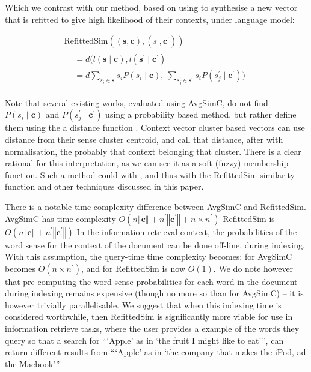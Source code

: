 \documentclass{sig-alternate}
\renewcommand{\c}{\mathbf{c}}
\newcommand{\s}{\mathbf{s}}
\begin{document}
Which we contrast with our method, based on using  to synthesise a new vector that is refitted to give high likelihood of their contexts, under language model:

\begin{multline}
	\mathrm{RefittedSim}((\s,\c),(s^{\prime},\c^{\prime}))\\
	\begin{aligned}
	&= d(l(\s \mid \c), l(\s^\prime \mid \c^\prime)\\
	&= d
	\sum_{s_{i}\in\s}s_{i}P(s_{i}\mid\c),\:
	\sum_{s_{j}^{\prime}\in\s^{\prime}}s_{i}P(s_{j}^{\prime}\mid\c^{\prime}))
	\end{aligned}
\end{multline}

Note that several existing works, evaluated using AvgSimC, do not find $P(s_{i}\mid\c)$ and $P(s_{j}^{\prime}\mid\c^\prime)$ using a probability based method, but rather define them using the a distance function \parencite{Reisinger2010, Huang2012}. Context vector cluster based vectors can use distance from their sense cluster centroid, and call that distance, after with normalisation, the probably that context belonging that cluster. There is a clear rational for this interpretation, as we can see it as a soft (fuzzy) membership function. Such a method could with , and thus with the RefittedSim similarity function and other techniques discussed in this paper. 
 

There is a notable time complexity difference between AvgSimC and RefittedSim.
AvgSimC has time complexity $O(n\left\Vert \c\right\Vert +n^{\prime}\left\Vert \c^{\prime}\right\Vert +n\times n^{\prime})$
RefittedSim is $O(n\left\Vert \c\right\Vert +n^{\prime}\left\Vert \c^{\prime}\right\Vert)$
In the information retrieval context, the probabilities of the word sense for the context of the document can be done off-line, during indexing. With this assumption, the query-time time complexity becomes: for AvgSimC becomes $O(n\times n^{\prime})$, and for RefittedSim is now $O(1)$. We do note however that pre-computing the word sense probabilities for each word in the document during indexing remains expensive (though no more so than for AvgSimC) -- it is however trivially parallelisable. We suggest that when this indexing time is considered worthwhile, then RefittedSim is significantly more viable for use in information retrieve tasks, where the user provides a example of the words they query so that a search for \enquote{\enquote{Apple} as in \enquote{the fruit I might like to eat}}, can return different results from \enquote{\enquote{Apple} as in \enquote{the company that makes the iPod, ad the Macbook}}.
\end{document}
